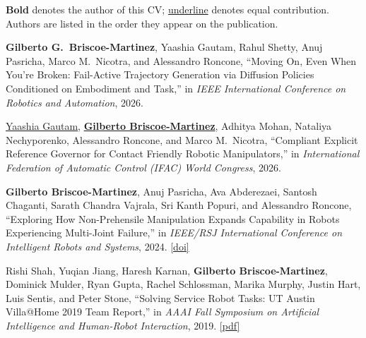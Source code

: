 
\begin{cvparagraph}
  \textbf{Bold} denotes the author of this CV; \underline{underline} denotes equal contribution. Authors are listed in the order they appear on the publication.
\end{cvparagraph}


\begin{pubSubsectionNum}
  \item \textbf{Gilberto G.\ Briscoe-Martinez}, Yaashia Gautam, Rahul Shetty, Anuj Pasricha, Marco M.\ Nicotra, and Alessandro Roncone, ``Moving On, Even When You're Broken: Fail-Active Trajectory Generation via Diffusion Policies Conditioned on Embodiment and Task,'' in \textit{IEEE International Conference on Robotics and Automation}, 2026.
  \item \underline{Yaashia Gautam}, \underline{\textbf{Gilberto Briscoe-Martinez}}, Adhitya Mohan, Nataliya Nechyporenko, Alessandro Roncone, and Marco M.\ Nicotra, ``Compliant Explicit Reference Governor for Contact Friendly Robotic Manipulators,'' in \textit{International Federation of Automatic Control (IFAC) World Congress}, 2026.
  \item \textbf{Gilberto Briscoe-Martinez}, Anuj Pasricha, Ava Abderezaei, Santosh Chaganti, Sarath Chandra Vajrala, Sri Kanth Popuri, and Alessandro Roncone, ``Exploring How Non-Prehensile Manipulation Expands Capability in Robots Experiencing Multi-Joint Failure,'' in \textit{IEEE/RSJ International Conference on Intelligent Robots and Systems}, 2024. \href{https://doi.org/10.1109/IROS58592.2024.10801883}{[\underline{doi}]}
  \item Rishi Shah, Yuqian Jiang, Haresh Karnan, \textbf{Gilberto Briscoe-Martinez}, Dominick Mulder, Ryan Gupta, Rachel Schlossman, Marika Murphy, Justin Hart, Luis Sentis, and Peter Stone, ``Solving Service Robot Tasks: UT Austin Villa@Home 2019 Team Report,'' in \textit{AAAI Fall Symposium on Artificial Intelligence and Human-Robot Interaction}, 2019. \href{https://arxiv.org/pdf/1909.06529.pdf}{[\underline{pdf}]}
\end{pubSubsectionNum}



